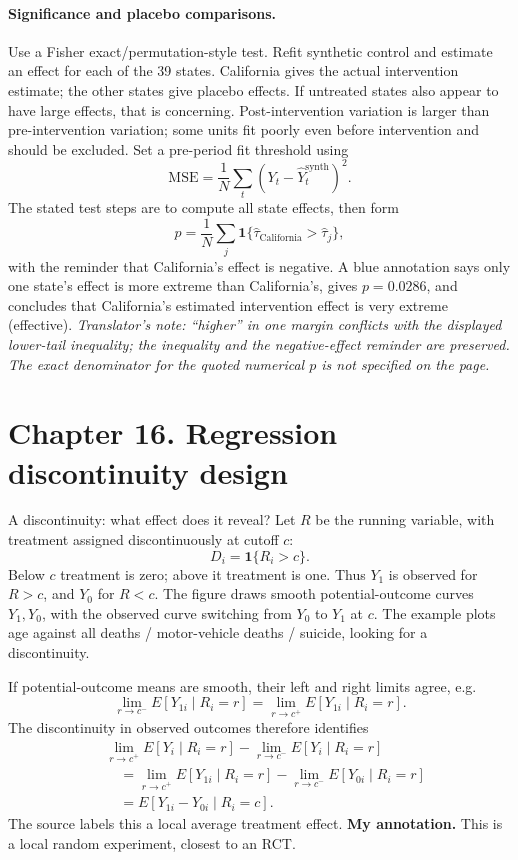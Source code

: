 \paragraph{Significance and placebo comparisons.}
Use a Fisher exact/permutation-style test. Refit synthetic control and estimate an effect for each of the 39 states. California gives the actual intervention estimate; the other states give placebo effects. If untreated states also appear to have large effects, that is concerning. Post-intervention variation is larger than pre-intervention variation; some units fit poorly even before intervention and should be excluded. Set a pre-period fit threshold using
\[\mathrm{MSE}=\frac1N\sum_t(Y_t-\widehat Y_t^{\mathrm{synth}})^2.\]
The stated test steps are to compute all state effects, then form
\[p=\frac1N\sum_j\mathbf1\{\hat\tau_{\mathrm{California}}>\hat\tau_j\},\]
with the reminder that California's effect is negative. A blue annotation says only one state's effect is more extreme than California's, gives $p=0.0286$, and concludes that California's estimated intervention effect is very extreme (effective). \textit{Translator's note: ``higher'' in one margin conflicts with the displayed lower-tail inequality; the inequality and the negative-effect reminder are preserved. The exact denominator for the quoted numerical $p$ is not specified on the page.}

\section{Chapter 16. Regression discontinuity design}
A discontinuity: what effect does it reveal? Let $R$ be the running variable, with treatment assigned discontinuously at cutoff $c$:
\[D_i=\mathbf1\{R_i>c\}.\]
Below $c$ treatment is zero; above it treatment is one. Thus $Y_1$ is observed for $R>c$, and $Y_0$ for $R<c$. The figure draws smooth potential-outcome curves $Y_1,Y_0$, with the observed curve switching from $Y_0$ to $Y_1$ at $c$. The example plots age against all deaths / motor-vehicle deaths / suicide, looking for a discontinuity.

If potential-outcome means are smooth, their left and right limits agree, e.g.
\[\lim_{r\to c^-}E[Y_{1i}\mid R_i=r]=\lim_{r\to c^+}E[Y_{1i}\mid R_i=r].\]
The discontinuity in observed outcomes therefore identifies
\begin{align*}
&\lim_{r\to c^+}E[Y_i\mid R_i=r]-\lim_{r\to c^-}E[Y_i\mid R_i=r]\\
&\quad=\lim_{r\to c^+}E[Y_{1i}\mid R_i=r]-\lim_{r\to c^-}E[Y_{0i}\mid R_i=r]\\
&\quad=E[Y_{1i}-Y_{0i}\mid R_i=c].
\end{align*}
The source labels this a local average treatment effect. \textbf{My annotation.} This is a local random experiment, closest to an RCT.

